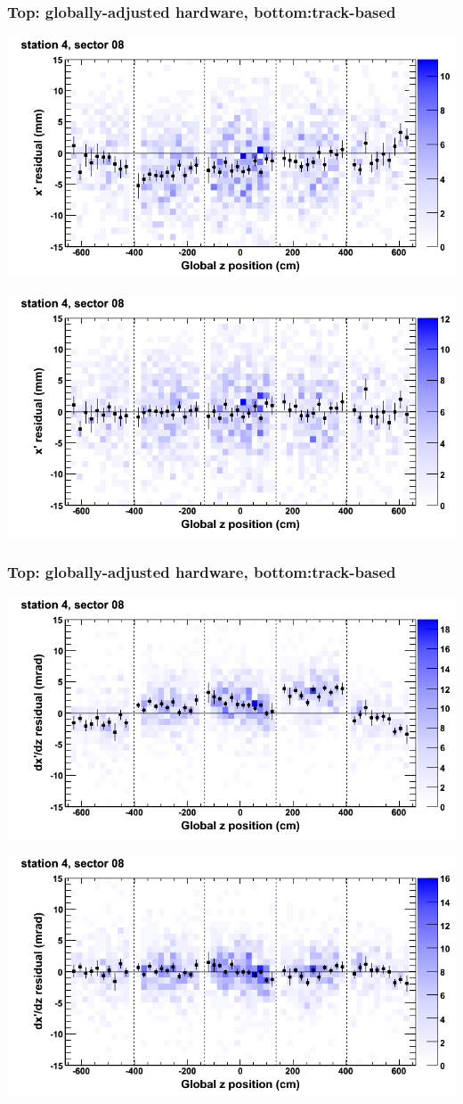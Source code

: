 \documentclass[compress]{beamer}
\begin{document}
\begin{frame}
\frametitle{Top: globally-adjusted hardware, bottom:track-based}
\includegraphics[width=0.7\linewidth]{NOV4_mapplots_HW/DTvsz_st4sec08_x.png}

\includegraphics[width=0.7\linewidth]{NOV4_mapplots/DTvsz_st4sec08_x.png}
\end{frame}

\begin{frame}
\frametitle{Top: globally-adjusted hardware, bottom:track-based}
\includegraphics[width=0.7\linewidth]{NOV4_mapplots_HW/DTvsz_st4sec08_dxdz.png}

\includegraphics[width=0.7\linewidth]{NOV4_mapplots/DTvsz_st4sec08_dxdz.png}
\end{frame}
\end{document}
